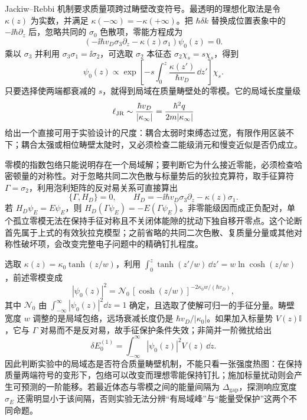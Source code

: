 Jackiw--Rebbi 机制要求质量项跨过畴壁改变符号。最透明的理想化取法是令 $\kappa(z)$ 为实数，并满足 $\kappa(-\infty)=-\kappa(+\infty)$。把 $\hbar\delta k$ 替换成位置表象中的 $-\ii\hbar\partial_z$ 后，忽略共同的 $\sigma_0$ 色散项，零能方程成为
\begin{equation}
\left(-\ii\hbar v_D\sigma_3\partial_z-\kappa(z)\sigma_1\right)\psi_0(z)=0.
\label{eq:ch03-jr-zero}
\end{equation}
乘以 $\sigma_3$ 并利用 $\sigma_3\sigma_1=\ii\sigma_2$，可选取 $\sigma_2$ 本征态 $\sigma_2\chi_s=s\chi_s$，得到
\begin{equation}
\psi_0(z)\propto
\exp\!\left[-s\int_0^z\frac{\kappa(z')}{\hbar v_D}\,\dd z'\right]\chi_s.
\label{eq:ch03-jr-envelope}
\end{equation}
只要选择使两端都衰减的 $s$，就得到局域在质量畴壁处的零模。它的局域长度量级
\begin{equation}
\ell_{\rm JR}\sim\frac{\hbar v_D}{|\kappa_\infty|}
=\frac{\hbar^2 q}{2m|\kappa_\infty|}
\label{eq:ch03-jr-length}
\end{equation}
给出一个直接可用于实验设计的尺度：耦合太弱时束缚态过宽，有限作用区装不下；耦合太强或相位畴壁太陡时，又必须检查二能级消元和慢变近似是否仍成立。


零模的指数包络只能说明存在一个局域解；要判断它为什么接近零能，必须检查哈密顿量的对称性。对于忽略共同二次色散与标量势后的狄拉克算符，取手征算符 $\Gamma=\sigma_2$，利用泡利矩阵的反对易关系可直接算出
\begin{equation}
\{\Gamma,H_D\}=0,\qquad
H_D=-\ii\hbar v_D\sigma_3\partial_z-\kappa(z)\sigma_1.
\label{eq:dirac-chiral-protection}
\end{equation}
若 $H_D\psi_E=E\psi_E$，则 $H_D(\Gamma\psi_E)=-E(\Gamma\psi_E)$。非零能级因而成正负配对，单个孤立零模无法在保持手征对称且不关闭体能隙的扰动下独自移开零点。这个论断首先属于上式的有效狄拉克模型；之前省略的共同二次色散、复质量分量或其他对称性破坏项，会改变完整电子问题中的精确钉扎程度。

选取 $\kappa(z)=\kappa_0\tanh(z/w)$，利用 $\int_0^z\tanh(z'/w)\,\dd z'=w\ln\cosh(z/w)$，前述零模变成
\begin{equation}
|\psi_0(z)|^2=\mathcal N_0\,[\cosh(z/w)]^{-2\kappa_0w/(\hbar v_D)},
\label{eq:dirac-wall-density}
\end{equation}
其中 $\mathcal N_0$ 由 $\int_{-\infty}^{\infty}|\psi_0(z)|^2\dd z=1$ 确定，且选取了使解可归一的手征分量。畴壁宽度 $w$ 调整的是局域包络，远场衰减长度仍是 $\hbar v_D/|\kappa_0|$。如果加入标量势 $V(z)\mathbb I$，它与 $\Gamma$ 对易而不是反对易，故手征保护条件失效；非简并一阶微扰给出
\begin{equation}
\delta E_0^{(1)}=\int_{-\infty}^{\infty}|\psi_0(z)|^2 V(z)\,\dd z.
\label{eq:dirac-scalar-shift}
\end{equation}
因此判断实验中的局域态是否符合质量畴壁机制，不能只看一张强度热图：在保持质量两端符号的变形下，包络可以改变而理想零能保持钉扎；施加标量扰动则会产生可预测的一阶能移。若最近体态与零模之间的能量间隔为 $\Delta_{\mathrm{gap}}$，探测响应宽度 $\sigma_E$ 还需明显小于该间隔，否则实验无法分辨“有局域峰”与“能量受保护”这两个不同命题。

